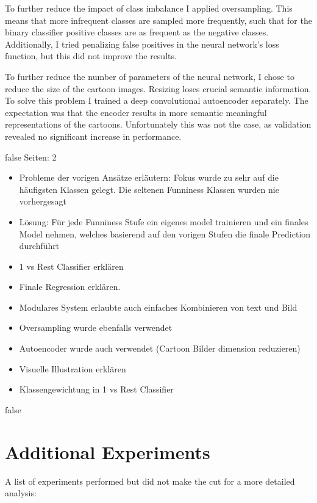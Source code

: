 \documentclass[draft,final,oneside]{vutinfth} %
\begin{document}
To further reduce the impact of class imbalance I applied oversampling. This means that more infrequent classes are sampled more frequently, such that for the binary classifier positive classes are as frequent as the negative classes. Additionally, I tried penalizing false positives in the neural network's loss function, but this did not improve the results.

To further reduce the number of parameters of the neural network, I chose to reduce the size of the cartoon images. Resizing loses crucial semantic information. To solve this problem I trained a deep convolutional autoencoder separately. The expectation was that the encoder results in more semantic meaningful representations of the cartoons. Unfortunately this was not the case, as validation revealed no significant increase in performance.


\if false
Seiten: 2

\begin{itemize}

\item Probleme der vorigen Ansätze erläutern: Fokus wurde zu sehr auf die häufigsten Klassen gelegt. Die seltenen Funniness Klassen wurden nie vorhergesagt
\item Lösung: Für jede Funniness Stufe ein eigenes model trainieren und ein finales Model nehmen, welches basierend auf den vorigen Stufen die finale Prediction durchführt
\item 1 vs Rest Classifier erklären
\item Finale Regression erklären.
\item Modulares System erlaubte auch einfaches Kombinieren von text und Bild
\item Oversampling wurde ebenfalls verwendet
\item Autoencoder wurde auch verwendet (Cartoon Bilder dimension reduzieren)
\item Visuelle Illustration erklären
\item Klassengewichtung in 1 vs Rest Classifier

\end{itemize}

\fi

\if false
\section{Additional Experiments}
A list of experiments performed but did not make the cut for a more detailed analysis:
\end{document}

